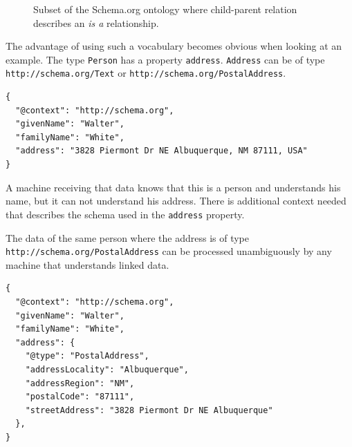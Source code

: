 \begin{figure}[!htb]
  \caption{\label{fig:schemaorg} Subset of the Schema.org ontology where child-parent relation describes an \textit{is a} relationship.}
\end{figure}

The advantage of using such a vocabulary becomes obvious when looking at an example. The type \lstinline{Person} has a property \lstinline{address}. \lstinline{Address} can be of type \lstinline{http://schema.org/Text} or \lstinline{http://schema.org/PostalAddress}.

\lstset{language=JSON}
\begin{lstlisting}[caption=A person with an address of type Text]
{
  "@context": "http://schema.org",
  "givenName": "Walter",
  "familyName": "White",
  "address": "3828 Piermont Dr NE Albuquerque, NM 87111, USA"
}
\end{lstlisting}

A machine receiving that data knows that this is a person and understands his name, but it can not understand his address. There is additional context needed that describes the schema used in the \lstinline{address} property.

The data of the same person where the address is of type \lstinline{http://schema.org/PostalAddress} can be processed unambiguously by any machine that understands linked data.

\lstset{language=JSON}
\begin{lstlisting}[caption=A person with an address of type PostalAddress]
{
  "@context": "http://schema.org",
  "givenName": "Walter",
  "familyName": "White",
  "address": {
    "@type": "PostalAddress",
    "addressLocality": "Albuquerque",
    "addressRegion": "NM",
    "postalCode": "87111",
    "streetAddress": "3828 Piermont Dr NE Albuquerque"
  },
}
\end{lstlisting}

